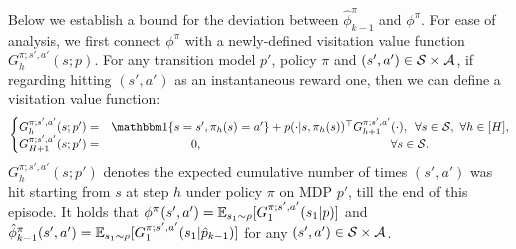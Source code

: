 Below we establish a bound for the deviation between  $\hat{\phi}_{k-1}^{\pi}$ and $\phi^{\pi}$. 
For ease of analysis, we first connect $\phi^{\pi}$ with a newly-defined visitation value function $G^{\pi;s',a'}_h(s;p)$. 
For any transition model $p'$, policy $\pi$ and $(s',a') \in \mathcal{S} \times \mathcal{A}$, if regarding hitting $(s',a')$ as an instantaneous reward one, then we can define a visitation value function:
\begin{equation}
	\left\{\begin{matrix}
		G^{\pi;s',a'}_h(s;p') =& \indicator\{ s=s', \pi_h(s)=a' \} + p(\cdot|s,\pi_h(s))^\top G^{\pi;s',a'}_{h+1}(\cdot) , \hspace*{0.5em} \forall s \in \cS,\ \forall h \in [H] ,
		\\
		G^{\pi;s',a'}_{H+1}(s;p') =& 0 , \hspace*{15.7em} \forall s \in \cS . \label{eq:visit_value_function}
	\end{matrix}\right. 
\end{equation}
$G^{\pi;s',a'}_h(s;p')$ denotes the expected cumulative number of times $(s',a')$ was hit starting from $s$ at step $h$ under policy $\pi$ on MDP $p'$,  till the end of this episode. It holds that $\phi^{\pi}(s',a')=\mathbb{E}_{s_1 \sim \rho}[G^{\pi;s',a'}_1(s_1|p)]$ and $\hat{\phi}_{k-1}^{\pi}(s',a')=\mathbb{E}_{s_1 \sim \rho}[G^{\pi;s',a'}_1(s_1|\hat{p}_{k-1})]$ for any $(s',a') \in \mathcal{S} \times \mathcal{A}$.

